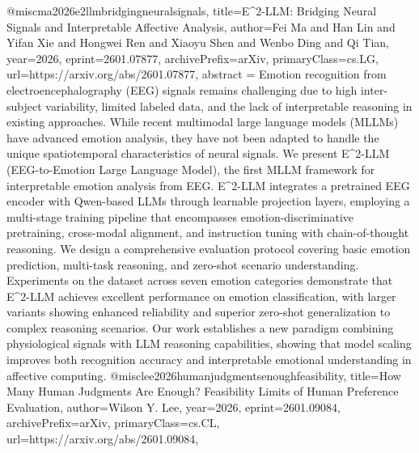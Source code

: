 {}@misc{ma2026e2llmbridgingneuralsignals,
      title={E^2-LLM: Bridging Neural Signals and Interpretable Affective Analysis}, 
      author={Fei Ma and Han Lin and Yifan Xie and Hongwei Ren and Xiaoyu Shen and Wenbo Ding and Qi Tian},
      year={2026},
      eprint={2601.07877},
      archivePrefix={arXiv},
      primaryClass={cs.LG},
      url={https://arxiv.org/abs/2601.07877},
      abstract = {Emotion recognition from electroencephalography (EEG) signals remains challenging due to high inter-subject variability, limited labeled data, and the lack of interpretable reasoning in existing approaches. While recent multimodal large language models (MLLMs) have advanced emotion analysis, they have not been adapted to handle the unique spatiotemporal characteristics of neural signals. We present E^2-LLM (EEG-to-Emotion Large Language Model), the first MLLM framework for interpretable emotion analysis from EEG. E^2-LLM integrates a pretrained EEG encoder with Qwen-based LLMs through learnable projection layers, employing a multi-stage training pipeline that encompasses emotion-discriminative pretraining, cross-modal alignment, and instruction tuning with chain-of-thought reasoning. We design a comprehensive evaluation protocol covering basic emotion prediction, multi-task reasoning, and zero-shot scenario understanding. Experiments on the dataset across seven emotion categories demonstrate that E^2-LLM achieves excellent performance on emotion classification, with larger variants showing enhanced reliability and superior zero-shot generalization to complex reasoning scenarios. Our work establishes a new paradigm combining physiological signals with LLM reasoning capabilities, showing that model scaling improves both recognition accuracy and interpretable emotional understanding in affective computing.}
}@misc{lee2026humanjudgmentsenoughfeasibility,
      title={How Many Human Judgments Are Enough? Feasibility Limits of Human Preference Evaluation}, 
      author={Wilson Y. Lee},
      year={2026},
      eprint={2601.09084},
      archivePrefix={arXiv},
      primaryClass={cs.CL},
      url={https://arxiv.org/abs/2601.09084},
}
